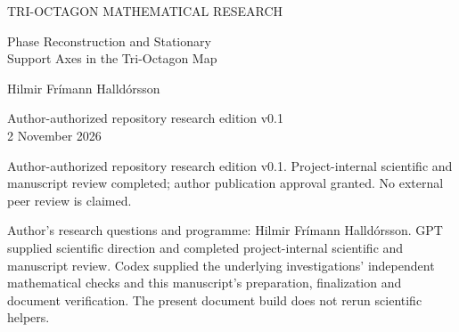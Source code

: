 \documentclass[11pt,a4paper]{article}
\numberwithin{equation}{section}
\theoremstyle{remark}\newtheorem{remark}[theorem]{Remark}
\begin{document}
\hypersetup{pageanchor=false}
\begin{titlepage}
\vspace*{8mm}
{\small\color{MidnightBlue} TRI-OCTAGON MATHEMATICAL RESEARCH\par}
\vspace{8mm}
{\LARGE\bfseries\raggedright Phase Reconstruction and Stationary\\
Support Axes in the Tri-Octagon Map\par}
\vspace{8mm}
{\large Hilmir Fr\'imann Halld\'orsson\par}
\vspace{4mm}
{\normalsize Author-authorized repository research edition v0.1\\2 November 2026\par}
\vspace{6mm}
{\small Author-authorized repository research edition v0.1. Project-internal scientific and manuscript review completed; author publication approval granted. No external peer review is claimed.\par}
\vspace{4mm}
\begin{abstract}
On an accepted invariant coherent domain of the native Tri-Octagon map, five real retained coordinates determine the full complex state up to common phase. We recover the complete native history from their closed evolution and one initial common phase. A canonical representative gives an explicit unit multiplier and a continuous ordinary increment with absolute-summability control and the inherited limiting-phase bound. The adjacent-state overlap is retained-data dependent and nonvanishing, but its angle differs from the canonical increment by the angle of the inner product of consecutive representatives. We prove the branch-resolved correction, its accumulation rule and its change under a different representative; an analytic family shows that the correction is not identically zero. Composing reconstruction with the adopted lossless face decoder yields exact vector histories. Pure rephasing rotates each face vector about its fixed normal line, and those positioned axes coincide with the existing stationary support lines, with reversed directed-angle convention. In contrast, a single proper ambient rotation representing that action for every admitted state and every fixed channel label exists only for whole-turn phases. The complete native step can also change amplitudes and relative phases. We separate these results from staged observations, memory updates and observations from current memory, and from any assignment of a material feature or rigid-body pose.
\end{abstract}
\vfill
{\small Author's research questions and programme: Hilmir Fr\'imann Halld\'orsson.
GPT supplied scientific direction and completed project-internal scientific and manuscript review.
Codex supplied the underlying investigations' independent mathematical checks and this manuscript's preparation, finalization and document verification.
The present document build does not rerun scientific helpers.}
\end{titlepage}
\setcounter{page}{2}\hypersetup{pageanchor=true}






\appendix


\end{document}

